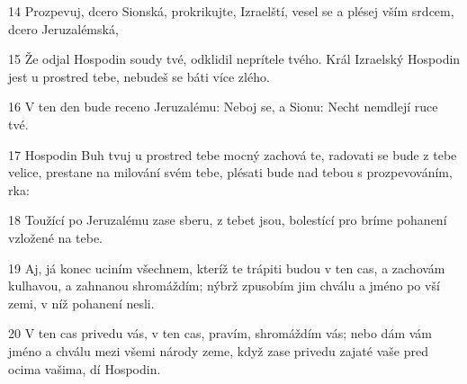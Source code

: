 \par 14 Prozpevuj, dcero Sionská, prokrikujte, Izraelští, vesel se a plésej vším srdcem, dcero Jeruzalémská,
\par 15 Že odjal Hospodin soudy tvé, odklidil neprítele tvého. Král Izraelský Hospodin jest u prostred tebe, nebudeš se báti více zlého.
\par 16 V ten den bude receno Jeruzalému: Neboj se, a Sionu: Necht nemdlejí ruce tvé.
\par 17 Hospodin Buh tvuj u prostred tebe mocný zachová te, radovati se bude z tebe velice, prestane na milování svém tebe, plésati bude nad tebou s prozpevováním, rka:
\par 18 Toužící po Jeruzalému zase sberu, z tebet jsou, bolestící pro bríme pohanení vzložené na tebe.
\par 19 Aj, já konec uciním všechnem, kteríž te trápiti budou v ten cas, a zachovám kulhavou, a zahnanou shromáždím; nýbrž zpusobím jim chválu a jméno po vší zemi, v níž pohanení nesli.
\par 20 V ten cas privedu vás, v ten cas, pravím, shromáždím vás; nebo dám vám jméno a chválu mezi všemi národy zeme, když zase privedu zajaté vaše pred ocima vašima, dí Hospodin.

